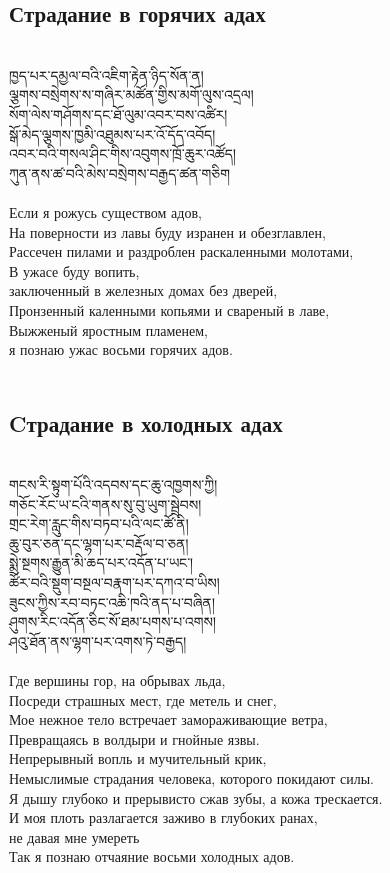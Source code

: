 \subsection*{Страдание в горячих адах}
\\
\ti
ཁྱད་པར་དམྱལ་བའི་འཇིག་རྟེན་ཉིད་སོན་ན།\\
ལྕགས་བསྲེགས་ས་གཞིར་མཚོན་གྱིས་མགོ་ལུས་འདྲལ།\\
སོག་ལེས་གཤོགས་དང་ཐོ་ལུམ་འབར་བས་འཚིར།\\
སྒོ་མེད་ལྕགས་ཁྱམི་འཐུམས་པར་འོ་དོད་འབོད།\\
འབར་བའི་གསལ་ཤིང་གིས་འབུགས་ཁྲོ་ཆུར་འཚོད།\\
ཀུན་ནས་ཚ་བའི་མེས་བསྲེགས་བརྒྱད་ཚན་གཅིག\\
\\
\ru
Если я рожусь существом адов,\\
На поверности из лавы буду изранен и обезглавлен,\\
Рассечен пилами и раздроблен раскаленными молотами,\\
В ужасе буду вопить, \\ \indent заключенный в железных домах без дверей,\\
Пронзенный каленными копьями и свареный в лаве,\\
Выжженый яростным пламенем, \\ \indent я познаю ужас восьми горячих адов.\\
\\
\newpage
\subsection*{Cтрадание в холодных адах}
\\
\ti
གངས་རི་སྟུག་པོའི་འདབས་དང་ཆུ་འཁྱགས་ཀྱི། \\
གཅོང་རོང་ཡ་ངའི་གནས་སུ་བུ་ཡུག་སྦྲེབས། \\
གྲང་རེག་རླུང་གིས་བཏབ་པའི་ལང་ཚོ་ནི། \\
ཆུ་བུར་ཅན་དང་ལྷག་པར་བརྡོལ་བ་ཅན། \\
སྨྲེ་སྔགས་རྒྱུན་མི་ཆད་པར་འདོན་པ་ཡང་། \\
ཚོར་བའི་སྡུག་བསྔལ་བརྣག་པར་དཀའ་བ་ཡིས།\\
ཟུངས་ཀྱིས་རབ་བཏང་འཆི་ཁའི་ནད་པ་བཞིན།\\
ཤུགས་རིང་འདོན་ཅིང་སོ་ཐམ་པགས་པ་འགས། \\
ཤའུ་ཐོན་ནས་ལྷག་པར་འགས་ཏེ་བརྒྱད།\\
\\
\ru
Где вершины гор, на обрывах льда,\\
Посреди страшных мест, где метель и снег,\\
Мое нежное тело встречает замораживающие ветра,\\
Превращаясь в волдыри и гнойные язвы.\\
Непрерывный вопль и мучительный крик,\\
Немыслимые страдания человека, которого покидают силы.\\
Я дышу глубоко и прерывисто сжав зубы, а кожа трескается.\\
И моя плоть разлагается заживо в глубоких ранах,\\
\indent не давая мне умереть\\
Так я познаю отчаяние восьми холодных адов.\\


